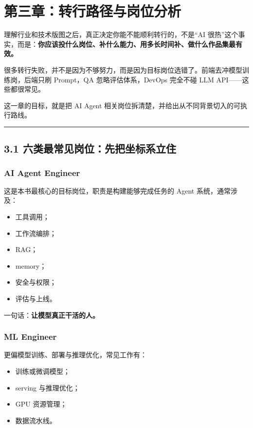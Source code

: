 \chapter{第三章：转行路径与岗位分析}

理解行业和技术版图之后，真正决定你能不能顺利转行的，不是``AI 很热''这个事实，而是：\textbf{你应该投什么岗位、补什么能力、用多长时间补、做什么作品集最有效。}


很多转行失败，并不是因为不够努力，而是因为目标岗位选错了。前端去冲模型训练岗，后端只刷 Prompt，QA 忽略评估体系，DevOps 完全不碰 LLM API------这些都很常见。


这一章的目标，就是把 AI Agent 相关岗位拆清楚，并给出从不同背景切入的可执行路线。


\bigskip\hrule\bigskip

\section{3.1 六类最常见岗位：先把坐标系立住}

\subsection{AI Agent Engineer}

这是本书最核心的目标岗位，职责是构建能够完成任务的 Agent 系统，通常涉及：


\begin{itemize}[leftmargin=2em]
\item 工具调用；
\item 工作流编排；
\item RAG；
\item memory；
\item 安全与权限；
\item 评估与上线。
\end{itemize}

一句话：\textbf{让模型真正干活的人。}


\subsection{ML Engineer}

更偏模型训练、部署与推理优化，常见工作有：


\begin{itemize}[leftmargin=2em]
\item 训练或微调模型；
\item serving 与推理优化；
\item GPU 资源管理；
\item 数据流水线。
\end{itemize}

